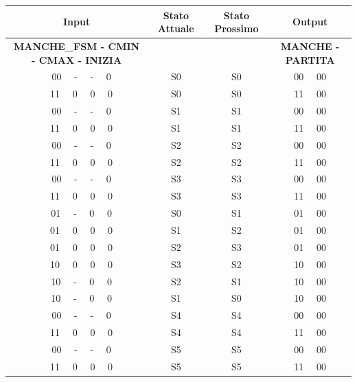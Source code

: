 \documentclass[a4paper]{report}
\begin{document}
\begin{center}
  \begin{table}[h]
      \centering
  \renewcommand{\arraystretch}{1.2}
  \footnotesize
  \ttfamily
  \begin{tabular}{|c|c|c|c|}
      \hline
      \textbf{Input} & \textbf{Stato Attuale} & \textbf{Stato Prossimo} & \textbf{Output}\\
      \hline
      \textbf{MANCHE\_FSM - CMIN - CMAX - INIZIA} &  &  & \textbf{MANCHE - PARTITA} \\ 
      \hline

      \ \  00 \ \ - \ \ - \ \ 0 & S0 & S0 & 00 \ \ 00 \\
      \cline{1-4} \ \ 
      11 \ \ 0 \ \ 0 \ \ 0 & S0 & S0 & 11 \ \ 00 \\
      \cline{1-4} \ \ 
      00 \ \ - \ \ - \ \ 0 & S1 & S1 & 00 \ \ 00 \\
      \cline{1-4} \ \ 
      11 \ \ 0 \ \ 0 \ \ 0 & S1 & S1 & 11 \ \ 00 \\
      \cline{1-4} \ \ 
      00 \ \ - \ \ - \ \ 0 & S2 & S2 & 00 \ \ 00 \\
      \cline{1-4} \ \ 
      11 \ \ 0 \ \ 0 \ \ 0 & S2 & S2 & 11 \ \ 00 \\
      \cline{1-4} \ \ 
      00 \ \ - \ \ - \ \ 0 & S3 & S3 & 00 \ \ 00 \\
      \cline{1-4} \ \ 
      11 \ \ 0 \ \ 0 \ \ 0 & S3 & S3 & 11 \ \ 00 \\
      \cline{1-4} \ \ 
      01 \ \ - \ \ 0 \ \ 0 & S0 & S1 & 01 \ \ 00 \\
      \cline{1-4} \ \ 
      01 \ \ 0 \ \ 0 \ \ 0 & S1 & S2 & 01 \ \ 00 \\
      \cline{1-4} \ \ 
      01 \ \ 0 \ \ 0 \ \ 0 & S2 & S3 & 01 \ \ 00 \\
      \cline{1-4} \ \ 
      10 \ \ 0 \ \ 0 \ \ 0 & S3 & S2 & 10 \ \ 00 \\
      \cline{1-4} \ \ 
      10 \ \ - \ \ 0 \ \ 0 & S2 & S1 & 10 \ \ 00 \\
      \cline{1-4} \ \ 
      10 \ \ - \ \ 0 \ \ 0 & S1 & S0 & 10 \ \ 00 \\
      \cline{1-4} \ \ 
      00 \ \ - \ \ - \ \ 0 & S4 & S4 & 00 \ \ 00 \\
      \cline{1-4} \ \ 
      11 \ \ 0 \ \ 0 \ \ 0 & S4 & S4 & 11 \ \ 00 \\
      \cline{1-4} \ \ 
      00 \ \ - \ \ - \ \ 0 & S5 & S5 & 00 \ \ 00 \\
      \cline{1-4} \ \ 
      11 \ \ 0 \ \ 0 \ \ 0 & S5 & S5 & 11 \ \ 00 \\

\end{tabular}
\end{table}
\end{center}
\end{document}
